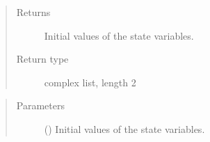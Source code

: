 \documentclass[letterpaper,10pt,english]{sphinxmanual}
\begin{document}
\begin{fulllineitems}

\begin{fulllineitems}
\label{\detokenize{model:model.sm_drive.Drive.get_initial_values}}
\pysigstartsignatures
{}
\pysigstopsignatures\begin{quote}\begin{description}
\item[{Returns}] \leavevmode
\sphinxAtStartPar
{} \textendash{} Initial values of the state variables.

\item[{Return type}] \leavevmode
\sphinxAtStartPar
complex list, length 2

\end{description}\end{quote}

\end{fulllineitems}


\begin{fulllineitems}
\label{\detokenize{model:model.sm_drive.Drive.set_initial_values}}
\pysigstartsignatures
{}
\pysigstopsignatures\begin{quote}\begin{description}
\item[{Parameters}] \leavevmode
\sphinxAtStartPar
{} () \textendash{} Initial values of the state variables.

\end{description}\end{quote}

\end{fulllineitems}


\end{fulllineitems}

\end{document}
